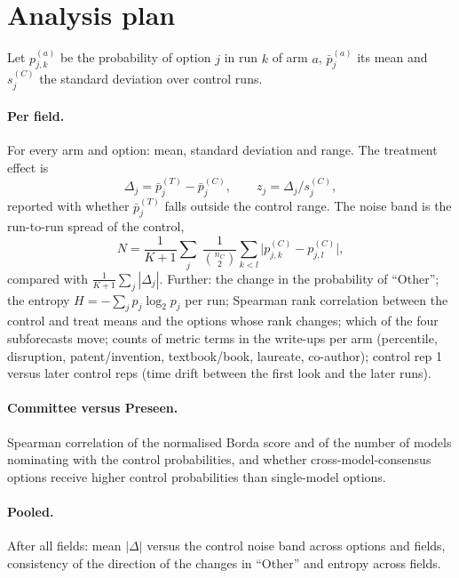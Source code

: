 \documentclass[11pt]{article}
\begin{document}
\section{Analysis plan}\label{sec:analysis}

Let $p^{(a)}_{j,k}$ be the probability of option $j$ in run $k$ of arm $a$, $\bar p^{(a)}_j$ its mean and $s^{(C)}_j$
the standard deviation over control runs.

\paragraph{Per field.} For every arm and option: mean, standard deviation and range. The treatment effect is
\begin{equation}
\Delta_j=\bar p^{(T)}_j-\bar p^{(C)}_j ,\qquad z_j=\Delta_j / s^{(C)}_j ,
\end{equation}
reported with whether $\bar p^{(T)}_j$ falls outside the control range. The noise band is the run-to-run spread of the
control,
\begin{equation}
N=\frac{1}{K+1}\sum_{j}\ \frac{1}{\binom{n_C}{2}}\sum_{k<l}\bigl|p^{(C)}_{j,k}-p^{(C)}_{j,l}\bigr| ,
\end{equation}
compared with $\frac{1}{K+1}\sum_j|\Delta_j|$. Further: the change in the probability of ``Other''; the entropy
$H=-\sum_j p_j\log_2p_j$ per run; Spearman rank correlation between the control and treat means and the options whose
rank changes; which of the four subforecasts move; counts of metric terms in the write-ups per arm (percentile,
disruption, patent/invention, textbook/book, laureate, co-author); control rep 1 versus later control reps (time
drift between the first look and the later runs).

\paragraph{Committee versus Preseen.} Spearman correlation of the normalised Borda score and of the number of models
nominating with the control probabilities, and whether cross-model-consensus options receive higher control
probabilities than single-model options.

\paragraph{Pooled.} After all fields: mean $|\Delta|$ versus the control noise band across options and fields,
consistency of the direction of the changes in ``Other'' and entropy across fields.
\end{document}
